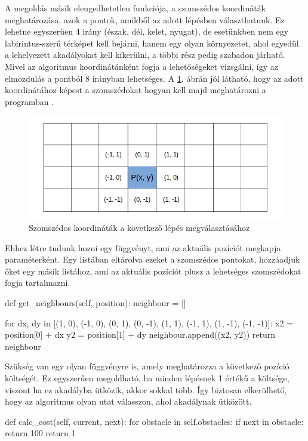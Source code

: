 
A megoldás másik elengedhetetlen funkciója, a szomszédos koordináták meghatározása, azok a pontok, amikből az adott lépésben választhatunk. Ez lehetne egyszerűen 4 irány (észak, dél, kelet, nyugat), de esetünkben nem egy labirintus-szerű térképet kell bejárni, hanem egy olyan környezetet, ahol egyedül a lehelyezett akadályokat kell kikerülni, a többi rész pedig szabadon járható. Mivel az algoritmus koordinátánként fogja a lehetőségeket vizsgálni, így az elmozdulás a pontból 8 irányban lehetséges. A \ref{fig:neighbours}. ábrán jól látható, hogy az adott koordinátához képest a szomszédokat hogyan kell majd meghatározni a programban \cite{breivik2005principles}.

\begin{figure}[h!]
\centering
\includegraphics[scale=0.60]{images/neighbours.png}
\caption{Szomszédos koordináták a következő lépés megválasztásához}
\label{fig:neighbours}
\end{figure}

\newpage

Ehhez létre tudunk hozni egy függvényt, ami az aktuális pozíciót megkapja paraméterként. Egy listában eltárolva ezeket a szomszédos pontokat, hozzáadjuk őket egy másik listához, ami az aktuális pozíciót plusz a lehetséges szomszédokat fogja tartalmazni. 

\begin{python}
	def get_neighbours(self, position):
        neighbour = []

        for dx, dy in [(1, 0), (-1, 0), (0, 1), (0, -1),
                       (1, 1), (-1, 1), (1, -1), (-1, -1)]:
            x2 = position[0] + dx
            y2 = position[1] + dy
            neighbour.append((x2, y2))
        return neighbour 
\end{python}


Szükség van egy olyan függvényre is, amely meghatározza a következő pozíció költségét. Ez egyszerűen megoldható, ha minden lépésnek 1 értékű a költsége, viszont ha ez akadályba ütközik, akkor sokkal több. Így biztosan elkerülhető, hogy az algoritmus olyan utat válasszon, ahol akadálynak ütközött.
\begin{python}
    def calc_cost(self, current, next):
        for obstacle in self.obstacles:
            if next in obstacle:
                return 100
        return 1
\end{python}


